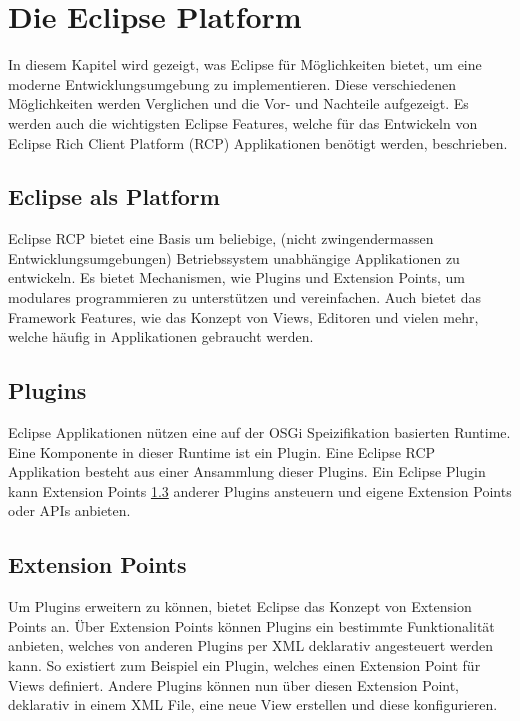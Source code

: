 \chapter{Die Eclipse Platform}
\label{sec:EclipsePlatform}

In diesem Kapitel wird gezeigt, was Eclipse für Möglichkeiten bietet, um eine moderne Entwicklungsumgebung zu implementieren. Diese verschiedenen Möglichkeiten werden Verglichen und die Vor- und Nachteile aufgezeigt. Es werden auch die wichtigsten Eclipse Features, welche für das Entwickeln von Eclipse Rich Client Platform (RCP) Applikationen benötigt werden, beschrieben.

\section{Eclipse als Platform}

Eclipse RCP bietet eine Basis um beliebige, (nicht zwingendermassen Entwicklungsumgebungen) Betriebssystem unabhängige Applikationen zu entwickeln. Es bietet Mechanismen, wie Plugins und Extension Points, um modulares programmieren zu unterstützen und vereinfachen. Auch bietet das Framework Features, wie das Konzept von Views, Editoren und vielen mehr, welche häufig in Applikationen gebraucht werden.

\section{Plugins}

Eclipse Applikationen nützen eine auf der OSGi Speizifikation basierten Runtime. Eine Komponente in dieser Runtime ist ein Plugin. Eine Eclipse RCP Applikation besteht aus einer Ansammlung dieser Plugins. Ein Eclipse Plugin kann Extension Points \ref{extensionpointssection} anderer Plugins ansteuern und eigene Extension Points oder APIs anbieten.

\section{Extension Points}
\label{extensionpointssection}

Um Plugins erweitern zu können, bietet Eclipse das Konzept von Extension Points an. Über Extension Points können Plugins ein bestimmte Funktionalität anbieten, welches von anderen Plugins per XML deklarativ angesteuert werden kann. 
\newline
So existiert zum Beispiel ein Plugin, welches einen Extension Point für Views definiert. Andere Plugins können nun über diesen Extension Point, deklarativ in einem XML File, eine neue View erstellen und diese konfigurieren. \cite{extensionpoints}


